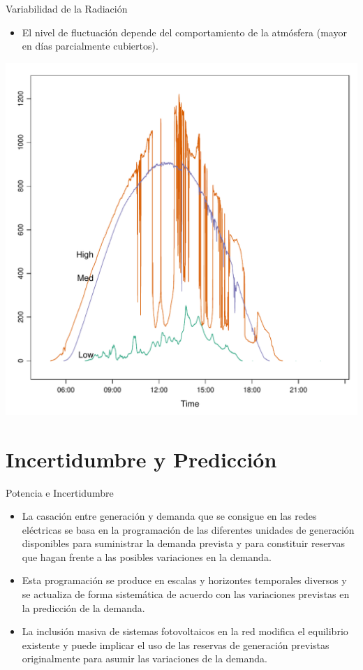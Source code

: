 \documentclass[aspectratio=169, usenames,svgnames,dvipsnames]{beamer}
\begin{document}
\begin{frame}[label={sec:org37be77f}]{Variabilidad de la Radiación}
\begin{itemize}
\item El nivel de fluctuación depende del comportamiento de la atmósfera (mayor en días parcialmente cubiertos).
\end{itemize}

\begin{center}
\includegraphics[height=0.65\textheight]{../figs/radLowMedHigh.pdf}
\end{center}
\end{frame}


\section{Incertidumbre y Predicción}
\label{sec:org1f108f3}
\begin{frame}[label={sec:org865d827}]{Potencia e Incertidumbre}
\begin{itemize}
\item La casación entre generación y demanda que se consigue en las redes
eléctricas se basa en la programación de las diferentes unidades de
generación disponibles para suministrar la demanda prevista y para
constituir reservas que hagan frente a las posibles variaciones en
la demanda.
\item Esta programación se produce en escalas y horizontes temporales
diversos y se actualiza de forma sistemática de acuerdo con las
variaciones previstas en la predicción de la demanda.
\item La inclusión masiva de sistemas fotovoltaicos en la red
modifica el equilibrio existente y puede implicar el uso de las
reservas de generación previstas originalmente para asumir las
variaciones de la demanda.
\end{itemize}
\end{frame}
\end{document}
